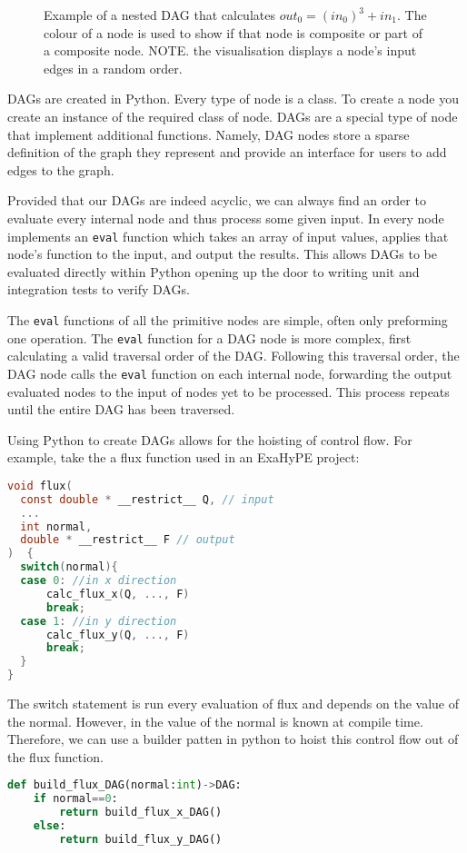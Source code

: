 \begin{figure}[h!]
    \centering
    \hspace{1em}
    \caption{Example of a nested DAG that calculates $out_0 = (in_0)^3 + in_1$. The colour of a node is used to show if that node is composite or part of a composite node. NOTE. the visualisation displays a node's input edges in a random order.}\label{fig:bn}
\end{figure}

DAGs are created in Python.
Every type of node is a class.
To create a node you create an instance of the required class of node.
DAGs are a special type of node that implement additional functions.
Namely, DAG nodes store a sparse definition of the graph they represent and provide an interface for users to add edges to the graph.

Provided that our DAGs are indeed acyclic, we can always find an order to evaluate every internal node and thus process some given input.
In \phlat every node implements an \texttt{eval} function which takes an array of input values, applies that node's function to the input, and output the results.
This allows DAGs to be evaluated directly within Python opening up the door to writing unit and integration tests to verify DAGs.

The \texttt{eval} functions of all the primitive nodes are simple, often only preforming one operation.
The \texttt{eval} function for a DAG node is more complex, first calculating a valid traversal order of the DAG.
Following this traversal order, the DAG node calls the \texttt{eval} function on each internal node, forwarding the output evaluated nodes to the input of nodes yet to be processed.
This process repeats until the entire DAG has been traversed.

Using Python to create DAGs allows for the hoisting of control flow.
For example, take the a flux function used in an ExaHyPE project:
\begin{lstlisting}[language=c]
void flux(
  const double * __restrict__ Q, // input
  ...
  int normal,
  double * __restrict__ F // output
)  {
  switch(normal){  
  case 0: //in x direction
	  calc_flux_x(Q, ..., F)
	  break;
  case 1: //in y direction
	  calc_flux_y(Q, ..., F)
	  break;
  }  
}
\end{lstlisting}
The switch statement is run every evaluation of flux and depends on the value of the normal.
However, in  the value of the normal is known at compile time.
Therefore, we can use a builder patten in python to hoist this control flow out of the flux function.
\begin{lstlisting}[language=python]
def build_flux_DAG(normal:int)->DAG:
    if normal==0:
        return build_flux_x_DAG()
    else:
        return build_flux_y_DAG()
\end{lstlisting}




